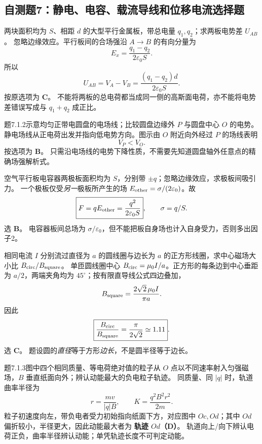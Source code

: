 \subsection{自测题7：静电、电容、载流导线和位移电流选择题}

\problemtext 两块面积均为 $S$、相距 $d$ 的大型平行金属板，带总电量 $q_1,q_2$；求两板电势差 $U_{AB}$。
\workings 忽略边缘效应。平行板间的合场强沿 $A\to B$ 的有向分量为
\[E_x=\frac{q_1-q_2}{2\varepsilon_0 S}.\]
所以
\[\boxed{U_{AB}=V_A-V_B=\frac{(q_1-q_2)d}{2\varepsilon_0 S}}.\]
按原选项为 \textbf{C}。
\crosscheck 不能将两板的总电荷都当成同一侧的高斯面电荷，亦不能将电势差错误写成与 $q_1+q_2$ 成正比。

\problemtext 题7.1.2示意均匀正带电圆盘的电场线；比较圆盘边缘外 $P$ 与圆盘中心 $O$ 的电势。
\workings 静电场线从正电荷出发并指向低电势方向。图示由 $O$ 附近向外经过 $P$ 的场线表明
\[\boxed{V_P<V_O}.\]
按选项为 \textbf{B}。
\crosscheck 只需沿电场线的电势下降性质，不需要先知道圆盘轴外任意点的精确场强解析式。

\problemtext 空气平行板电容器两极板面积均为 $S$，分别带 $\pm q$；忽略边缘效应，求极板间吸引力。
\workings 一个极板仅受\emph{另一}极板所产生的场 $E_{\rm other}=\sigma/(2\varepsilon_0)$。故
\[\boxed{F=qE_{\rm other}=\frac{q^2}{2\varepsilon_0 S}},\qquad \sigma=q/S.\]
选 \textbf{B}。
\crosscheck 电容器板间总场为 $\sigma/\varepsilon_0$，但不能把板自身场也计入自身受力，否则多出因子2。

\problemtext 相同电流 $I$ 分别流过直径为 $a$ 的圆线圈与边长为 $a$ 的正方形线圈，求中心磁场大小比 $B_{\rm circ}/B_{\rm square}$。
\workings 单匝圆线圈中心 $B_{\rm circ}=\mu_0I/a$。正方形的每条边到中心垂距为 $a/2$，两端夹角均为 $45^\circ$；按有限直导线公式四边叠加，
\[B_{\rm square}=\frac{2\sqrt2\,\mu_0I}{\pi a}.\]
因此
\[\boxed{\frac{B_{\rm circ}}{B_{\rm square}}=\frac{\pi}{2\sqrt2}\simeq1.11}.\]
选 \textbf{C}。
\crosscheck 题设圆的\emph{直径}等于方形\emph{边长}，不是圆半径等于边长。

\problemtext 题7.1.3图中四个相同质量、等电荷绝对值的粒子从 $O$ 点以不同速率射入匀强磁场，$B$ 垂直纸面向外；辨认动能最大的负电粒子轨迹。
\workings 同质量、同 $|q|$ 时，轨道曲率半径为
\[r=\frac{mv}{|q|B},\qquad K=\frac{q^2 B^2r^2}{2m}.\]
粒子初速度向左，带负电者受力初始指向纸面下方，对应图中 $Oc,Od$；其中 $Od$ 偏折较小，半径更大，因此动能最大者为 \textbf{轨迹 $Od$（D）}。
\crosscheck 轨道向上/向下辨认电荷正负，曲率半径辨认动能；单凭轨迹长度不可判定动能。

